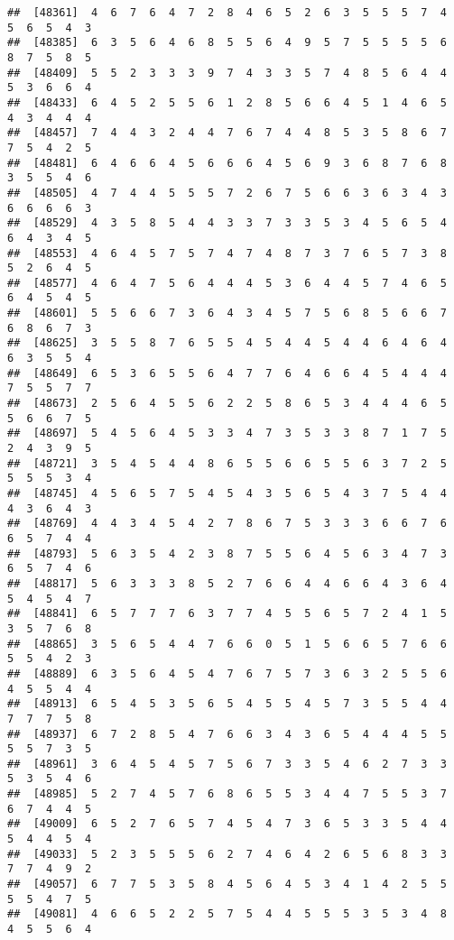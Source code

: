\documentclass[
]{book}
\begin{document}
\begin{verbatim}
##  [48361]  4  6  7  6  4  7  2  8  4  6  5  2  6  3  5  5  5  7  4  5  6  5  4  3
##  [48385]  6  3  5  6  4  6  8  5  5  6  4  9  5  7  5  5  5  5  6  8  7  5  8  5
##  [48409]  5  5  2  3  3  3  9  7  4  3  3  5  7  4  8  5  6  4  4  5  3  6  6  4
##  [48433]  6  4  5  2  5  5  6  1  2  8  5  6  6  4  5  1  4  6  5  4  3  4  4  4
##  [48457]  7  4  4  3  2  4  4  7  6  7  4  4  8  5  3  5  8  6  7  7  5  4  2  5
##  [48481]  6  4  6  6  4  5  6  6  6  4  5  6  9  3  6  8  7  6  8  3  5  5  4  6
##  [48505]  4  7  4  4  5  5  5  7  2  6  7  5  6  6  3  6  3  4  3  6  6  6  6  3
##  [48529]  4  3  5  8  5  4  4  3  3  7  3  3  5  3  4  5  6  5  4  6  4  3  4  5
##  [48553]  4  6  4  5  7  5  7  4  7  4  8  7  3  7  6  5  7  3  8  5  2  6  4  5
##  [48577]  4  6  4  7  5  6  4  4  4  5  3  6  4  4  5  7  4  6  5  6  4  5  4  5
##  [48601]  5  5  6  6  7  3  6  4  3  4  5  7  5  6  8  5  6  6  7  6  8  6  7  3
##  [48625]  3  5  5  8  7  6  5  5  4  5  4  4  5  4  4  6  4  6  4  6  3  5  5  4
##  [48649]  6  5  3  6  5  5  6  4  7  7  6  4  6  6  4  5  4  4  4  7  5  5  7  7
##  [48673]  2  5  6  4  5  5  6  2  2  5  8  6  5  3  4  4  4  6  5  5  6  6  7  5
##  [48697]  5  4  5  6  4  5  3  3  4  7  3  5  3  3  8  7  1  7  5  2  4  3  9  5
##  [48721]  3  5  4  5  4  4  8  6  5  5  6  6  5  5  6  3  7  2  5  5  5  5  3  4
##  [48745]  4  5  6  5  7  5  4  5  4  3  5  6  5  4  3  7  5  4  4  4  3  6  4  3
##  [48769]  4  4  3  4  5  4  2  7  8  6  7  5  3  3  3  6  6  7  6  6  5  7  4  4
##  [48793]  5  6  3  5  4  2  3  8  7  5  5  6  4  5  6  3  4  7  3  6  5  7  4  6
##  [48817]  5  6  3  3  3  8  5  2  7  6  6  4  4  6  6  4  3  6  4  5  4  5  4  7
##  [48841]  6  5  7  7  7  6  3  7  7  4  5  5  6  5  7  2  4  1  5  3  5  7  6  8
##  [48865]  3  5  6  5  4  4  7  6  6  0  5  1  5  6  6  5  7  6  6  5  5  4  2  3
##  [48889]  6  3  5  6  4  5  4  7  6  7  5  7  3  6  3  2  5  5  6  4  5  5  4  4
##  [48913]  6  5  4  5  3  5  6  5  4  5  5  4  5  7  3  5  5  4  4  7  7  7  5  8
##  [48937]  6  7  2  8  5  4  7  6  6  3  4  3  6  5  4  4  4  5  5  5  5  7  3  5
##  [48961]  3  6  4  5  4  5  7  5  6  7  3  3  5  4  6  2  7  3  3  5  3  5  4  6
##  [48985]  5  2  7  4  5  7  6  8  6  5  5  3  4  4  7  5  5  3  7  6  7  4  4  5
##  [49009]  6  5  2  7  6  5  7  4  5  4  7  3  6  5  3  3  5  4  4  5  4  4  5  4
##  [49033]  5  2  3  5  5  5  6  2  7  4  6  4  2  6  5  6  8  3  3  7  7  4  9  2
##  [49057]  6  7  7  5  3  5  8  4  5  6  4  5  3  4  1  4  2  5  5  5  5  4  7  5
##  [49081]  4  6  6  5  2  2  5  7  5  4  4  5  5  5  3  5  3  4  8  4  5  5  6  4

\end{verbatim}
\end{document}
